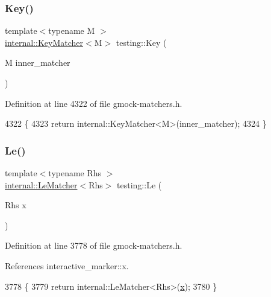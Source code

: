 \subsubsection{\texorpdfstring{Key()}{Key()}}
{\footnotesize\ttfamily template$<$typename M $>$ \\
\hyperlink{classtesting_1_1internal_1_1KeyMatcher}{internal\+::\+Key\+Matcher}$<$M$>$ testing\+::\+Key (\begin{DoxyParamCaption}\item[{M}]{inner\+\_\+matcher }\end{DoxyParamCaption})\hspace{0.3cm}{\ttfamily [inline]}}



Definition at line 4322 of file gmock-\/matchers.\+h.


\begin{DoxyCode}
4322                                                   \{
4323   \textcolor{keywordflow}{return} internal::KeyMatcher<M>(inner\_matcher);
4324 \}
\end{DoxyCode}
\mbox{\label{namespacetesting_a2e33596921b80a7fdaff3f62bf18a478}} 
\subsubsection{\texorpdfstring{Le()}{Le()}\hspace{0.1cm}{\footnotesize\ttfamily [1/2]}}
{\footnotesize\ttfamily template$<$typename Rhs $>$ \\
\hyperlink{classtesting_1_1internal_1_1LeMatcher}{internal\+::\+Le\+Matcher}$<$Rhs$>$ testing\+::\+Le (\begin{DoxyParamCaption}\item[{Rhs}]{x }\end{DoxyParamCaption})\hspace{0.3cm}{\ttfamily [inline]}}



Definition at line 3778 of file gmock-\/matchers.\+h.



References interactive\+\_\+marker\+::x.


\begin{DoxyCode}
3778                                         \{
3779   \textcolor{keywordflow}{return} internal::LeMatcher<Rhs>(\hyperlink{namespaceinteractive__marker_acda52804aef30b460a72fb21ee01d69d}{x});
3780 \}
\end{DoxyCode}
\mbox{\label{namespacetesting_a04def1c627ea7e3fce2f08cb06e83ebc}} 
